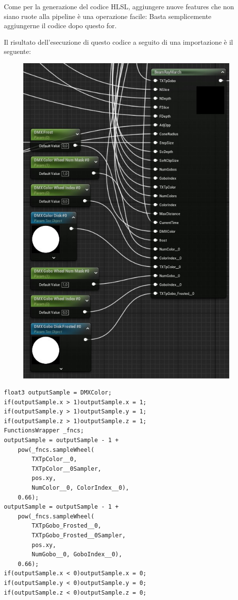 \documentclass[main.tex]{subfiles}
\begin{document}
Come per la generazione del codice HLSL, aggiungere nuove features che non siano ruote alla pipeline è una operazione facile: Basta semplicemente aggiungerne il codice dopo questo for.\newline

Il risultato dell'esecuzione di questo codice a seguito di una importazione è il seguente: 
\begin{figure}
    \centering
    \captionsetup{justification=centering}
    \includegraphics[scale=0.516]{img/renderingPipeline/beamMaterialGenerated.jpg}
    \label{fig:2_beamGenerated}
\end{figure}
\lstset{language=glsl}
\begin{lstlisting}
float3 outputSample = DMXColor;
if(outputSample.x > 1)outputSample.x = 1;
if(outputSample.y > 1)outputSample.y = 1;
if(outputSample.z > 1)outputSample.z = 1;
FunctionsWrapper _fncs;
outputSample = outputSample - 1 +
    pow(_fncs.sampleWheel(
        TXTpColor__0,
        TXTpColor__0Sampler,
        pos.xy,
        NumColor__0, ColorIndex__0),
    0.66);
outputSample = outputSample - 1 +
    pow(_fncs.sampleWheel(
        TXTpGobo_Frosted__0,
        TXTpGobo_Frosted__0Sampler,
        pos.xy,
        NumGobo__0, GoboIndex__0),
    0.66);
if(outputSample.x < 0)outputSample.x = 0;
if(outputSample.y < 0)outputSample.y = 0;
if(outputSample.z < 0)outputSample.z = 0;
\end{lstlisting}
\clearpage
\end{document}
